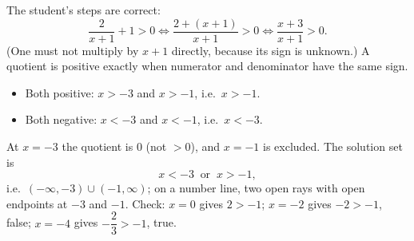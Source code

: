 The student's steps are correct:
\[
\dfrac{2}{x+1}+1>0\iff\dfrac{2+(x+1)}{x+1}>0\iff\dfrac{x+3}{x+1}>0 .
\]
(One must not multiply by $x+1$ directly, because its sign is unknown.) A quotient is positive exactly when numerator and denominator have the same sign.
\begin{itemize}
\item Both positive: $x>-3$ and $x>-1$, i.e.\ $x>-1$.
\item Both negative: $x<-3$ and $x<-1$, i.e.\ $x<-3$.
\end{itemize}
At $x=-3$ the quotient is $0$ (not $>0$), and $x=-1$ is excluded. The solution set is
\[
\boxed{x<-3\ \text{ or }\ x>-1},
\]
i.e.\ $(-\infty,-3)\cup(-1,\infty)$; on a number line, two open rays with open endpoints at $-3$ and $-1$. Check: $x=0$ gives $2>-1$; $x=-2$ gives $-2>-1$, false; $x=-4$ gives $-\dfrac{2}{3}>-1$, true.
